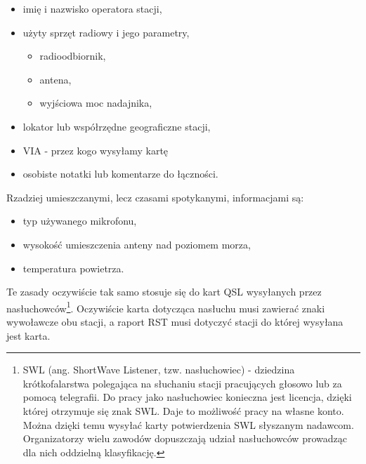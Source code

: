 \documentclass[]{mgr}
\begin{document}
        \begin{itemize}
            \item imię i nazwisko operatora stacji,
            \item użyty sprzęt radiowy i jego parametry,
            \begin{itemize}
                \item radioodbiornik,
                \item antena,
                \item wyjściowa moc nadajnika,
            \end{itemize}
            \item lokator lub współrzędne geograficzne stacji,
            \item VIA - przez kogo wysyłamy kartę
            \item osobiste notatki lub komentarze do łączności.
        \end{itemize}
        Rzadziej umieszczanymi, lecz czasami spotykanymi, informacjami są:
        \begin{itemize}
            \item typ używanego mikrofonu,
            \item wysokość umieszczenia anteny nad poziomem morza,
            \item temperatura powietrza.
        \end{itemize}
        Te zasady oczywiście tak samo stosuje się do kart QSL wysyłanych przez nasłuchowców\footnote{SWL (ang. ShortWave Listener, tzw. nasłuchowiec) - dziedzina krótkofalarstwa polegająca na słuchaniu stacji pracujących głosowo lub za pomocą telegrafii. Do pracy jako nasłuchowiec konieczna jest licencja, dzięki której otrzymuje się znak SWL. Daje to możliwość pracy na własne konto. Można dzięki temu wysyłać karty potwierdzenia SWL słyszanym nadawcom. Organizatorzy wielu zawodów dopuszczają udział nasłuchowców prowadząc dla nich oddzielną klasyfikację.}. Oczywiście karta dotycząca nasłuchu musi zawierać znaki wywoławcze obu stacji, a raport RST musi dotyczyć stacji do której wysyłana jest karta.
\end{document}
